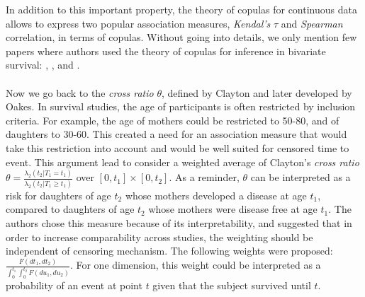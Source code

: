 \documentclass[]{article}
\begin{document}
In addition to this important property, the theory of copulas for continuous data allows to express two popular association measures, \emph{Kendal's} $\tau$ and \emph{Spearman} correlation, in terms of copulas. Without going into details, we only mention few papers where authors used the theory of copulas for inference in bivariate survival: \cite{shih1996tests}, \cite{shih1995inferences}, and \cite{zhang2008inference}.\\
~\\
Now we go back to the \emph{cross ratio} $\theta$, defined by Clayton and later developed by Oakes. In survival studies, the age of participants is often restricted by inclusion criteria. For example, the age of mothers could be restricted to 50-80, and of daughters to 30-60. This created a need for an association measure that would take this restriction into account and would be well suited for censored time to event. This argument lead \cite{fan2000dependence} to consider a weighted average of Clayton's \textit{cross ratio} $\theta = \frac{ \lambda_2(t_2|T_1=t_1)}{\lambda_2(t_2|T_1 \geq t_1)}$ over $[0,t_1] \times [0, t_2]$. As a reminder, $\theta$ can be interpreted as a risk for daughters of age $t_2$ whose mothers developed a disease at age $t_1$, compared to daughters of age $t_2$ whose mothers were disease free at age $t_1$. The authors chose this measure because of its interpretability, and suggested that in order to increase comparability across studies, the weighting should be independent of censoring mechanism. The following weights were proposed: $\frac{F(dt_1,dt_2)}{\int_0^{t_1}\int_0^{t_2} F(du_1, du_2)}$. For one dimension, this weight could be interpreted as a probability of an event at point $t$ given that the subject survived until $t$.\\
\end{document}
